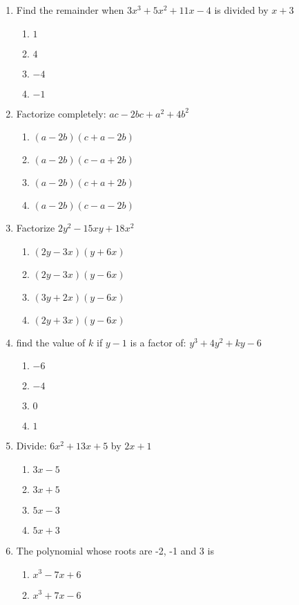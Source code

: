 \begin{multicols}{2}
\begin{enumerate}[label={\arabic*.}]
\item Find the remainder when $3x^3 + 5x^2 + 11x -4$ is divided by $x+3$
	\begin{enumerate}[label={\Alph*.}]
	\item \(1\)
	\item \(4\)
	\item \(-4\)
	\item \(-1\)
	\end{enumerate}
\item Factorize completely: $ac -2bc + a^2 + 4b^2$ 
	\begin{enumerate}[label={\Alph*.}]
	\item \((a-2b)(c+a-2b)\)
	\item \((a-2b)(c-a+2b)\)
	\item \((a-2b)(c+a+2b)\)
	\item \((a-2b)(c-a-2b)\)
	\end{enumerate}
\item Factorize $2y^2 - 15xy + 18x^2$
	\begin{enumerate}[label={\Alph*.}]
	\item \((2y - 3x)(y + 6x)\)
	\item \((2y -3x)(y-6x)\)
	\item \((3y + 2x )(y -6x)\)
	\item \((2y + 3x)(y-6x)\)
	\end{enumerate}
\item find the value of $k$ if $y-1$ is a factor of: $y^3 + 4y^2 + ky - 6$ 
	\begin{enumerate}[label={\Alph*.}]
	\item \(-6\)
	\item \(-4\)
	\item \(0\)
	\item \(1\)
	\end{enumerate}
\item Divide: $6x^2 + 13x + 5$ by $2x +1$ 
	\begin{enumerate}[label={\Alph*.}]
	\item \(3x -5\)
	\item \(3x + 5\)
	\item \(5x -3\)
	\item \(5x + 3\)
	\end{enumerate}
\item The polynomial whose roots are -2, -1 and 3 is
	\begin{enumerate}[label={\Alph*.}]
	\item \(x^3 - 7x + 6\)
	\item \(x^3 + 7x -6\)

\end{enumerate}
\end{enumerate}
\end{multicols}
